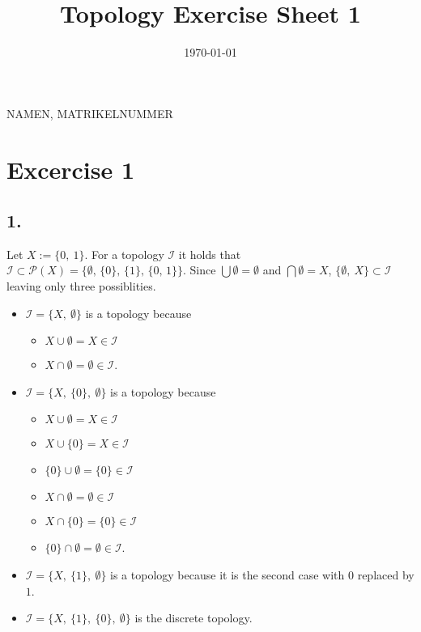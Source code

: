 \documentclass{article}
\title{Topology Exercise Sheet 1}
\date{\today}
\begin{document}
\maketitle

NAMEN, MATRIKELNUMMER

\section*{Excercise 1}
\label{sec:Ex1}
\subsection*{1.}
Let $X := \{0,\ 1\}$.
For a topology $\mathcal{I}$ it holds that $\mathcal{I} \subset{\mathcal{P}(X)} = \{ \emptyset ,\, \{0\} ,\, \{1\} ,\, \{0,\, 1\}\}$.
Since $\bigcup \emptyset = \emptyset$ and $\bigcap \emptyset = X$, $\{ \emptyset ,\ X \} \subset \mathcal{I}$ leaving only three possiblities.
\begin{itemize}
\item $\mathcal{I} = \{X ,\ \emptyset \}$ is a topology because
  \begin{itemize}
  \item $X \cup \emptyset = X \in \mathcal{I}$
  \item $X \cap \emptyset = \emptyset \in \mathcal{I}$.
  \end{itemize}
\item $\mathcal{I} = \{X ,\ \{0\} ,\ \emptyset\}$ is a topology because
  \begin{itemize}
  \item $X \cup \emptyset = X \in \mathcal{I}$
  \item $X \cup \{0\} = X \in \mathcal{I}$
  \item $\{0\} \cup \emptyset = \{0\} \in \mathcal{I}$
  \item $X \cap \emptyset = \emptyset \in \mathcal{I}$
  \item $X \cap \{0\} = \{0\} \in \mathcal{I}$
  \item $\{0\} \cap \emptyset = \emptyset \in \mathcal{I}$.
  \end{itemize}
\item $\mathcal{I} = \{X ,\ \{1\} ,\ \emptyset\}$ is a topology because it is the second case with $0$ replaced by $1$.
\item $\mathcal{I} = \{X ,\ \{1\} ,\ \{0\} ,\ \emptyset\}$ is the discrete topology.
\end{itemize}
\end{document}
